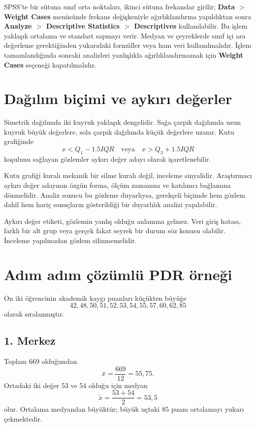 SPSS'te bir sütuna sınıf orta noktaları, ikinci sütuna frekanslar girilir;
\textbf{Data $>$ Weight Cases} menüsünde frekans değişkeniyle ağırlıklandırma
yapıldıktan sonra \textbf{Analyze $>$ Descriptive Statistics $>$ Descriptives}
kullanılabilir. Bu işlem yaklaşık ortalama ve standart sapmayı verir. Medyan
ve çeyreklerde sınıf içi ara değerleme gerektiğinden yukarıdaki formüller veya
ham veri kullanılmalıdır. İşlem tamamlandığında sonraki analizleri yanlışlıkla
ağırlıklandırmamak için \textbf{Weight Cases} seçeneği kapatılmalıdır.

\section{Dağılım biçimi ve aykırı değerler}

Simetrik dağılımda iki kuyruk yaklaşık dengelidir. Sağa çarpık dağılımda uzun
kuyruk büyük değerlere, sola çarpık dağılımda küçük değerlere uzanır. Kutu
grafiğinde
\[
x<Q_1-1.5IQR \quad\text{veya}\quad x>Q_3+1.5IQR
\]
koşulunu sağlayan gözlemler aykırı değer adayı olarak işaretlenebilir.

Kutu grafiği kuralı mekanik bir silme kuralı değil, inceleme sinyalidir.
Araştırmacı aykırı değer adayının özgün forma, ölçüm zamanına ve katılımcı
bağlamına dönmelidir. Analiz sonucu bu gözleme duyarlıysa, gerekçeli biçimde
hem gözlem dahil hem hariç sonuçların gösterildiği bir duyarlılık analizi
yapılabilir.

\begin{mistakebox}
Aykırı değer etiketi, gözlemin yanlış olduğu anlamına gelmez. Veri giriş
hatası, farklı bir alt grup veya gerçek fakat seyrek bir durum söz konusu
olabilir. İnceleme yapılmadan gözlem silinmemelidir.
\end{mistakebox}

\section{Adım adım çözümlü PDR örneği}

On iki öğrencinin akademik kaygı puanları küçükten büyüğe
\[
42,48,50,51,52,53,54,55,57,60,62,85
\]
olarak sıralanmıştır.

\subsection*{1. Merkez}

Toplam $669$ olduğundan
\[
\bar{x}=\frac{669}{12}=55{,}75.
\]
Ortadaki iki değer 53 ve 54 olduğu için medyan
\[
\widetilde{x}=\frac{53+54}{2}=53{,}5
\]
olur. Ortalama medyandan büyüktür; büyük uçtaki 85 puanı ortalamayı yukarı
çekmektedir.

